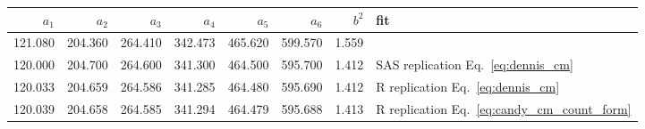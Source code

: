 
\begin{tabular}{r|r|r|r|r|r|r|l}
\hline
$a_1$ & $a_2$ & $a_3$ & $a_4$ & $a_5$ & $a_6$ & $b^2$ & fit\\
\hline
121.080 & 204.360 & 264.410 & 342.473 & 465.620 & 599.570 & 1.559 & \citep{kemp1986stochastic}\\
\hline
120.000 & 204.700 & 264.600 & 341.300 & 464.500 & 595.700 & 1.412 & SAS replication Eq.~\ref{eq:dennis_cm}\\
\hline
120.033 & 204.659 & 264.586 & 341.285 & 464.480 & 595.690 & 1.412 & R replication Eq.~\ref{eq:dennis_cm}\\
\hline
120.039 & 204.658 & 264.585 & 341.294 & 464.479 & 595.688 & 1.413 & R replication Eq.~\ref{eq:candy_cm_count_form}\\
\hline
\end{tabular}